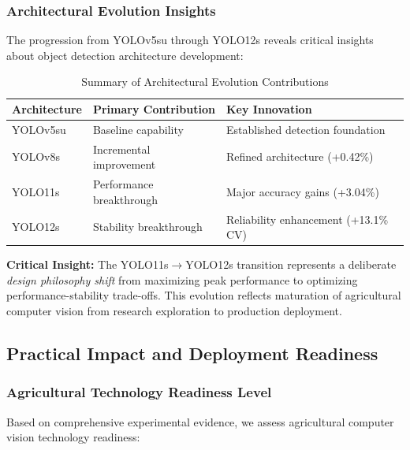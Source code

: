 \subsubsection{Architectural Evolution Insights}

The progression from YOLOv5su through YOLO12s reveals critical insights about object detection architecture development:

\begin{table}[htbp]
\centering
\caption{Summary of Architectural Evolution Contributions}
\label{tab:arch_evolution_summary}
\begin{tabular}{lll}
\toprule
\textbf{Architecture} & \textbf{Primary Contribution} & \textbf{Key Innovation} \\
\midrule
YOLOv5su  & Baseline capability & Established detection foundation \\
YOLOv8s   & Incremental improvement & Refined architecture (+0.42\%) \\
YOLO11s   & Performance breakthrough & Major accuracy gains (+3.04\%) \\
YOLO12s   & Stability breakthrough & Reliability enhancement (+13.1\% CV) \\
\bottomrule
\end{tabular}
\end{table}

\textbf{Critical Insight:} The YOLO11s$\rightarrow$YOLO12s transition represents a deliberate \textit{design philosophy shift} from maximizing peak performance to optimizing performance-stability trade-offs. This evolution reflects maturation of agricultural computer vision from research exploration to production deployment.

\subsection{Practical Impact and Deployment Readiness}

\subsubsection{Agricultural Technology Readiness Level}

Based on comprehensive experimental evidence, we assess agricultural computer vision technology readiness:

